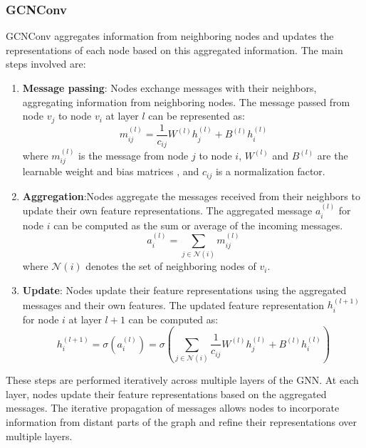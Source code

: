 \subsubsection{GCNConv}
GCNConv aggregates information from neighboring nodes and updates the representations of each node based on this aggregated information. The main steps involved are:
\begin{enumerate} 
    \item \textbf{Message passing}: Nodes exchange messages with their neighbors, aggregating information from neighboring nodes. The message passed from node $v_j$ to node $v_i$ at layer $l$ can be represented as:
        \[ m_{ij}^{(l)} = \frac{1}{c_{ij}} W^{(l)} h_j^{(l)} + B^{(l)} h_i^{(l)}  \]
        where $m_{ij}^{(l)}$ is the message from node $j$ to node $i$, $W^{(l)}$ and $B^{(l)}$ are the learnable weight and bias matrices , and $c_{ij}$ is a normalization factor.
    
    \item \textbf{Aggregation}:Nodes aggregate the messages received from their neighbors to update their own feature representations. The aggregated message $a_i^(l)$ for node $i$ can be computed as the sum or average of the incoming messages.
        \[ a_i^{(l)} = \sum_{j \in \mathcal{N}(i)} m_{ij}^{(l)} \]
    where $\mathcal{N}(i)$ denotes the set of neighboring nodes of $v_i$.
    \item \textbf{Update}: Nodes update their feature representations using the aggregated messages and their own features. The updated feature representation $h_i^{(l+1)}$ for node $i$ at layer $l+1$ can be computed as:
        \[ h_i^{(l+1)} = \sigma(a_i^{(l)}) = \sigma \left(\sum_{j \in \mathcal{N}(i)} \frac{1}{c_{ij}} W^{(l)} h_j^{(l)} + B^{(l)} h_i^{(l)} \right)\]
\end{enumerate}
These steps are performed iteratively across multiple layers of the GNN. At each layer, nodes update their feature representations based on the aggregated messages. The iterative propagation of messages allows nodes to incorporate information from distant parts of the graph and refine their representations over multiple layers. \\
